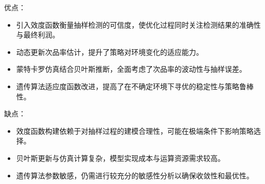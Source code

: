\documentclass{article}
\begin{document}
	优点：  
	\begin{itemize}
		\item 引入效度函数衡量抽样检测的可信度，使优化过程同时关注检测结果的准确性与最终利润。
		\item 动态更新次品率估计，提升了策略对环境变化的适应能力。
		\item 蒙特卡罗仿真结合贝叶斯推断，全面考虑了次品率的波动性与抽样误差。
		\item 遗传算法适应度函数改进，提高了在不确定环境下寻优的稳定性与策略鲁棒性。
	\end{itemize}
	
	缺点：  
	\begin{itemize}
		\item 效度函数构建依赖于对抽样过程的建模合理性，可能在极端条件下影响策略选择。
		\item 贝叶斯更新与仿真计算复杂，模型实现成本与运算资源需求较高。
		\item 遗传算法参数敏感，仍需进行较充分的敏感性分析以确保收敛性和最优性。
	\end{itemize}
	

	\newpage
\end{document}
